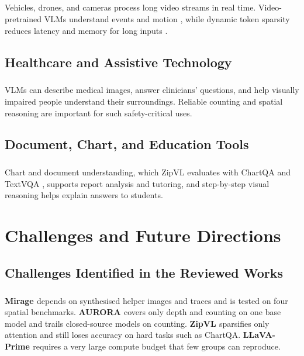 \documentclass[12pt,a4paper,final]{extreport}
\begin{document}
\paragraph{} Vehicles, drones, and cameras process long video streams in real time. Video-pretrained VLMs understand events and motion \cite{p4}, while dynamic token sparsity reduces latency and memory for long inputs \cite{p3}.

\section{Healthcare and Assistive Technology}

\paragraph{} VLMs can describe medical images, answer clinicians' questions, and help visually impaired people understand their surroundings. Reliable counting and spatial reasoning \cite{p1,p2} are important for such safety-critical uses.

\section{Document, Chart, and Education Tools}

\paragraph{} Chart and document understanding, which ZipVL evaluates with ChartQA and TextVQA \cite{p3}, supports report analysis and tutoring, and step-by-step visual reasoning \cite{p1} helps explain answers to students.

\chapter{Challenges and Future Directions}

\section{Challenges Identified in the Reviewed Works}

\paragraph{} \textbf{Mirage \cite{p1}} depends on synthesised helper images and traces and is tested on four spatial benchmarks. \textbf{AURORA \cite{p2}} covers only depth and counting on one base model and trails closed-source models on counting. \textbf{ZipVL \cite{p3}} sparsifies only attention and still loses accuracy on hard tasks such as ChartQA. \textbf{LLaVA-Prime \cite{p4}} requires a very large compute budget that few groups can reproduce.
\end{document}
